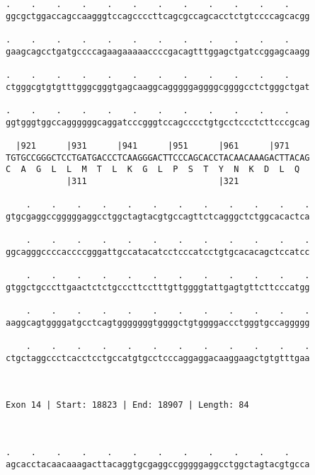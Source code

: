 \documentclass{article}
\begin{document}
\begin{Verbatim}
.    .    .    .    .    .    .    .    .    .    .    .    
ggcgctggaccagccaagggtccagccccttcagcgccagcacctctgtccccagcacgg
                                                            
.    .    .    .    .    .    .    .    .    .    .    .    
gaagcagcctgatgccccagaagaaaaaccccgacagtttggagctgatccggagcaagg
                                                            
.    .    .    .    .    .    .    .    .    .    .    .    
ctgggcgtgtgtttgggcgggtgagcaaggcagggggaggggcggggcctctgggctgat
                                                            
.    .    .    .    .    .    .    .    .    .    .    .    
ggtgggtggccaggggggcaggatcccgggtccagcccctgtgcctccctcttcccgcag
                                                            
  |921      |931      |941      |951      |961      |971    
TGTGCCGGGCTCCTGATGACCCTCAAGGGACTTCCCAGCACCTACAACAAAGACTTACAG
C  A  G  L  L  M  T  L  K  G  L  P  S  T  Y  N  K  D  L  Q  
            |311                          |321              
  
    .    .    .    .    .    .    .    .    .    .    .    .
gtgcgaggccgggggaggcctggctagtacgtgccagttctcagggctctggcacactca
                                                            
    .    .    .    .    .    .    .    .    .    .    .    .
ggcagggccccaccccgggattgccatacatcctcccatcctgtgcacacagctccatcc
                                                            
    .    .    .    .    .    .    .    .    .    .    .    .
gtggctgcccttgaactctctgcccttcctttgttggggtattgagtgttcttcccatgg
                                                            
    .    .    .    .    .    .    .    .    .    .    .    .
aaggcagtggggatgcctcagtgggggggtggggctgtggggaccctgggtgccaggggg
                                                            
    .    .    .    .    .    .    .    .    .    .    .    .
ctgctaggccctcacctcctgccatgtgcctcccaggaggacaaggaagctgtgtttgaa
                                                            
                                                            
 
Exon 14 | Start: 18823 | End: 18907 | Length: 84



.    .    .    .    .    .    .    .    .    .    .    .    
agcacctacaacaaagacttacaggtgcgaggccgggggaggcctggctagtacgtgcca
                                                            

\end{Verbatim}
\end{document}
